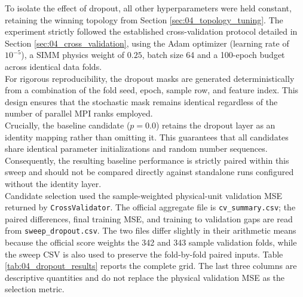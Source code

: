 To isolate the effect of dropout, all other hyperparameters were held constant, retaining the winning topology from Section \ref{sec:04_topology_tuning}. The experiment strictly followed the established cross-validation protocol detailed in Section \ref{sec:04_cross_validation}, using the Adam optimizer (learning rate of $10^{-5}$), a SIMM physics weight of $0.25$, batch size 64 and a 100-epoch budget across identical data folds.\\

For rigorous reproducibility, the dropout masks are generated deterministically from a combination of the fold seed, epoch, sample row, and feature index. This design ensures that the stochastic mask remains identical regardless of the number of parallel MPI ranks employed.\\
Crucially, the baseline candidate ($p = 0.0$) retains the dropout layer as an identity mapping rather than omitting it. This guarantees that all candidates share identical parameter initializations and random number sequences. Consequently, the resulting baseline performance is strictly paired within this sweep and should not be compared directly against standalone runs configured without the identity layer.\\

Candidate selection used the sample-weighted physical-unit validation MSE returned by \texttt{CrossValidator}. The official aggregate file is \texttt{cv\_summary.csv}; the paired differences, final training MSE, and training to validation gaps are read from \texttt{sweep\_dropout.csv}. The two files differ slightly in their arithmetic means because the official score weights the 342 and 343 sample validation folds, while the sweep CSV is also used to preserve the fold-by-fold paired inputs. Table \ref{tab:04_dropout_results} reports the complete grid. The last three columns are descriptive quantities and do not replace the physical validation MSE as the selection metric.

